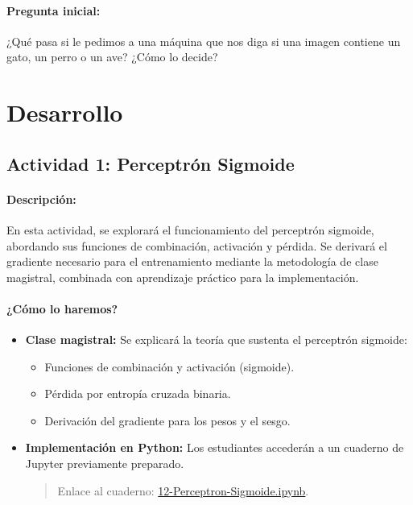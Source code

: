 \documentclass[a4,11pt]{aleph-notas}
\begin{document}
\paragraph{Pregunta inicial:} 
¿Qué pasa si le pedimos a una máquina que nos diga si una imagen contiene un gato, un perro o un ave? ¿Cómo lo decide?


\section*{Desarrollo}

\subsection*{Actividad 1: Perceptrón Sigmoide}

\paragraph{Descripción:} 
En esta actividad, se explorará el funcionamiento del perceptrón sigmoide, abordando sus funciones de combinación, activación y pérdida. Se derivará el gradiente necesario para el entrenamiento mediante la metodología de clase magistral, combinada con aprendizaje práctico para la implementación.

\paragraph{¿Cómo lo haremos?}  
\begin{itemize}[leftmargin=*]
    \item \textbf{Clase magistral:} Se explicará la teoría que sustenta el perceptrón sigmoide:
    \begin{itemize}
        \item Funciones de combinación y activación (sigmoide).
        \item Pérdida por entropía cruzada binaria.
        \item Derivación del gradiente para los pesos y el sesgo.
    \end{itemize}
    \item \textbf{Implementación en Python:} Los estudiantes accederán a un cuaderno de Jupyter previamente preparado.
    \begin{quote}
        Enlace al cuaderno: \href{https://colab.research.google.com/github/andres-merino/AprendizajeAutomaticoInicial-05-N0105/blob/main/2-Notebooks/12-Perceptron-Sigmoide.ipynb}{12-Perceptron-Sigmoide.ipynb}.
    \end{quote}
\end{itemize}
\end{document}
